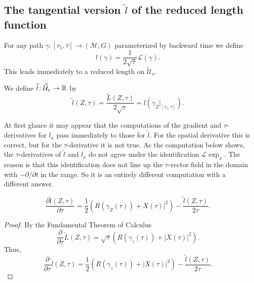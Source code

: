 \subsection{The tangential version $\widetilde l$ of the reduced length function}

For any path $\gamma\colon [\tau_1,\bar\tau]\to ({\mathcal M},G)$
parameterized by backward time we define
$$l(\gamma)=\frac{1}{2\sqrt{\bar\tau}}{\mathcal L}(\gamma).$$
This leads immediately to a reduced length on $\widetilde {\mathcal
U}_x$.


\begin{definition}\label{def:reduced-length-tangential}

We define $\widetilde l\colon \widetilde {\mathcal U}_x\to
\mathbb{R}$  by
$$\widetilde l(Z,\tau)=\frac{\widetilde L(Z,\tau)}{2\sqrt{\tau}}=l(\gamma_Z|_{[\tau_1,\bar\tau]}).$$
\end{definition}

At first glance it may appear that the computations of the gradient
and $\tau$-derivatives for $l_x$ pass immediately to those for
$\widetilde l$. For the spatial derivative this is correct, but for
the $\tau$-derivative it is not true. As the computation below
shows, the $\tau$-derivatives of $\widetilde l$ and $l_x$ do not
agree under the identification ${\mathcal L}\exp_x$. The reason
is that this identification does not line up the $\tau$-vector field
in the domain with $-\partial/\partial t$ in the range. So it is an
entirely different computation with a different answer.




\begin{lemma}\label{lem:reduced-length-tangential-tau-derivative}
\label{tildeltau}

$$\frac{\partial \widetilde
l(Z,\tau)}{\partial
\tau}=\frac{1}{2}\left(R(\gamma_Z(\tau))+X(\tau)|^2\right)-\frac{\widetilde
l(Z,\tau)}{2\tau}.$$
\end{lemma}

\begin{proof}
\sketch
{}
By the Fundamental Theorem of Calculus
$$\frac{\partial}{\partial\tau}\widetilde L(Z,\tau)=\sqrt{\tau}\left(R(\gamma_z(\tau))+|X(\tau)|^2\right).$$
Thus,
$$\frac{\partial}{\partial\tau}\widetilde l(Z,\tau)=\frac{1}{2}\left(R(\gamma_z(\tau))+|X(\tau)|^2\right)
-\frac{\widetilde l(Z,\tau)}{2\tau}.$$
\end{proof}

